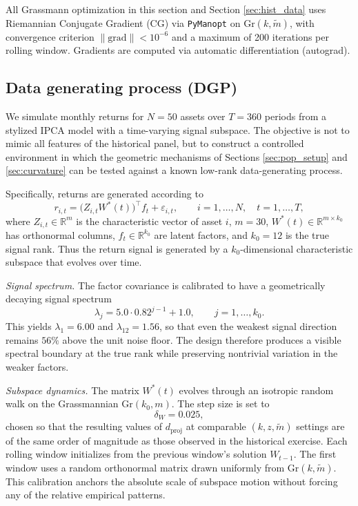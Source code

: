 \documentclass[11pt,letterpaper]{article}
\newcommand{\gr}{\mathrm{Gr}}
\newcommand{\dproj}{d_{\mathrm{proj}}}
\newcommand{\bR}{\mathbb{R}}
\begin{document}
All Grassmann optimization in this section and Section \ref{sec:hist_data} uses Riemannian Conjugate Gradient (CG) via \texttt{PyManopt} \cite{KW21} on $\gr(k, \tilde m)$, with convergence criterion $\|\mathrm{grad}\| < 10^{-6}$ and a maximum of 200 iterations per rolling window. Gradients are computed via automatic differentiation (autograd).

\subsection{Data generating process (DGP)}
\label{sec:sim:dgp}

We simulate monthly returns for $N=50$ assets over $T=360$ periods from a stylized IPCA model with a time-varying signal subspace. The objective is not to mimic all features of the historical panel, but to construct a controlled environment in which the geometric mechanisms of Sections \ref{sec:pop_setup} and \ref{sec:curvature} can be tested against a known low-rank data-generating process.

Specifically, returns are generated according to
\begin{equation*}
r_{i,t} = \bigl(Z_{i,t}W^*(t)\bigr)^\top f_t + \varepsilon_{i,t}, \qquad i=1,\dots,N,\quad t=1,\dots,T,
\end{equation*}
where $Z_{i,t}\in \bR^m$ is the characteristic vector of asset $i$, $m=30$, $W^*(t)\in \bR^{m\times k_0}$ has orthonormal columns, $f_t\in \bR^{k_0}$ are latent factors, and $k_0=12$ is the true signal rank. Thus the return signal is generated by a $k_0$-dimensional characteristic subspace that evolves over time.

\textit{Signal spectrum.} The factor covariance is calibrated to have a geometrically decaying signal spectrum
\begin{equation*}
\lambda_j = 5.0\cdot 0.82^{j-1}+1.0,
\qquad j=1,\dots,k_0.
\end{equation*}
This yields $\lambda_1=6.00$ and $\lambda_{12}=1.56$, so that even the weakest signal direction remains $56\%$ above the unit noise floor. The design therefore produces a visible spectral boundary at the true rank while preserving nontrivial variation in the weaker factors.

\textit{Subspace dynamics.} The matrix $W^*(t)$ evolves through an isotropic random walk on the Grassmannian $\gr(k_0,m)$. The step size is set to
\begin{equation*}
\delta_W = 0.025,
\end{equation*}
chosen so that the resulting values of $\dproj$ at comparable $(k,z,\tilde m)$ settings are of the same order of magnitude as those observed in the historical exercise. Each rolling window initializes from the previous window's solution $W_{t-1}$.  The first window uses a random orthonormal matrix drawn uniformly from $\gr(k, \tilde m)$. This calibration anchors the absolute scale of subspace motion without forcing any of the relative empirical patterns.
\end{document}
